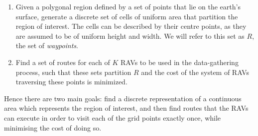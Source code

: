 \begin{enumerate}
    \item Given a polygonal region defined by a set of points that lie on the earth's surface, generate a discrete set of cells of uniform area that partition the region of interest.
    The cells can be described by their centre points, as they are assumed to be of uniform height and width. We will refer to this set as $R$, the set of \textit{waypoints}.
    \item Find a set of routes for each of $K$ RAVs to be used in the data-gathering process, such that these sets partition $R$ and the cost of the system of RAVs traversing these points is minimized. %
\end{enumerate}

Hence there are two main goals: find a discrete representation of a continuous area which represents the region of interest, and then find routes that the RAVs can execute in order to visit each of the grid points exactly once, while minimising the cost of doing so. 










